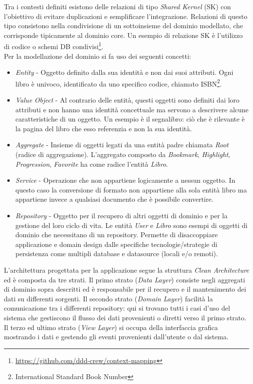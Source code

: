 Tra i contesti definiti esistono delle relazioni di tipo \textit{Shared Kernel}\cite{evans_domain-driven_2004} (SK) con l'obiettivo di evitare duplicazioni e semplificare l'integrazione. Relazioni di questo tipo consistono nella condivisione di un sottoinsieme del dominio modellato, che corrisponde tipicamente al dominio core. Un esempio di relazione SK è l'utilizzo di codice o schemi DB condivisi\footnote{\url{https://github.com/ddd-crew/context-mapping}}.\\
Per la modellazione del dominio si fa uso dei seguenti concetti\cite{evans_domain-driven_2004}:
\begin{itemize}
    \item \textit{Entity} - Oggetto definito dalla sua identità e non dai suoi attributi. Ogni libro è univoco, identificato da uno specifico codice, chiamato ISBN\footnote{International Standard Book Number}.
    \item \textit{Value Object} - Al contrario delle entità, questi oggetti sono definiti dai loro attributi e non hanno una identità concettuale ma servono a descrivere alcune caratteristiche di un oggetto. Un esempio è il segnalibro: ciò che è rilevante è la pagina del libro che esso referenzia e non la sua identità.
    \item \textit{Aggregate} - Insieme di oggetti legati da una entità padre chiamata \textit{Root} (radice di aggregazione). L'aggregato composto da \textit{Bookmark}, \textit{Highlight}, \textit{Progression}, \textit{Favorite} ha come radice l'entità \textit{Libro}.
    \item \textit{Service} - Operazione che non appartiene logicamente a nessun oggetto. In questo caso la conversione di formato non appartiene alla sola entità libro ma appartiene invece a qualsiasi documento che è possibile convertire.
    \item \textit{Repository} - Oggetto per il recupero di altri oggetti di dominio e per la gestione del loro ciclo di vita. Le entità \textit{User} e \textit{Libro} sono esempi di oggetti di dominio che necessitano di un repository. Permette di disaccoppiare applicazione e domain design dalle specifiche tecnologie/strategie di persistenza come multipli database e datasource (locali e/o remoti).
\end{itemize}

L'architettura progettata per la applicazione segue la struttura \textit{Clean Architecture}\cite{Martin17} ed è composta da tre strati. Il primo strato (\textit{Data Layer}) consiste negli aggregati di dominio sopra descritti ed è responsabile per il recupero e il mantenimento dei dati su differenti sorgenti. Il secondo strato (\textit{Domain Layer}) facilità la comunicazione tra i differenti repository: qui si trovano tutti i casi d'uso del sistema che gestiscono il flusso dei dati provenienti o diretti verso il primo strato. Il terzo ed ultimo strato (\textit{View Layer}) si occupa della interfaccia grafica mostrando i dati e gestendo gli eventi provenienti dall'utente o dal sistema.

